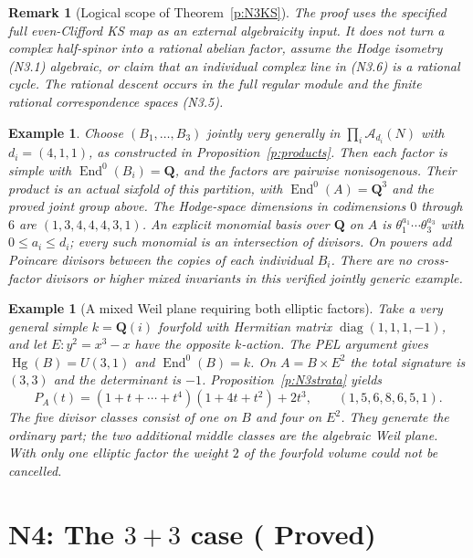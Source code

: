 \documentclass[11pt,reqno]{article}
\theoremstyle{emphasizedplain}
\DeclareRobustCommand{\provedstatus}{%
  \texorpdfstring{\textcolor{ProvedGreen}{\textbf{Proved}}}{Proved}}
\theoremstyle{emphasizeddefinition}
\newtheorem{example}[theorem]{Example}
\theoremstyle{emphasizeddefinition}
\newtheorem{remark}[theorem]{Remark}
\DeclareMathOperator{\End}{End}
\DeclareMathOperator{\Hg}{Hg}
\newcommand{\Q}{\mathbf Q}
\begin{document}
\begin{remark}[Logical scope of Theorem~\ref{p:N3KS}]
The proof uses the \emph{specified} full even-Clifford KS map as an
external algebraicity input. It does not turn a complex half-spinor
into a rational abelian factor, assume the Hodge isometry (N3.1)
algebraic, or claim that an individual complex line in (N3.6) is a
rational cycle. The rational descent occurs in the full regular module
and the finite rational correspondence spaces (N3.5).
\end{remark}
\begin{example}
Choose $(B_1,\ldots,B_{3})$ jointly very generally in
$\prod_i\mathcal A_{d_i}(N)$ with $d_i=(4,1,1)$,
as constructed in Proposition~\ref{p:products}. Then each factor is
simple with $\End^0(B_i)=\Q$, and the factors are pairwise nonisogenous.
Their product is an actual sixfold of this partition, with
$\End^0(A)=\Q^{3}$ and the proved joint group above.
The Hodge-space dimensions in codimensions $0$ through $6$ are
$(1,3,4,4,4,3,1)$.
An explicit monomial basis over $\Q$ on $A$ is
$\theta_1^{a_1}\cdots\theta_{3}^{a_{3}}$ with
$0\leq a_i\leq d_i$; every such monomial is an intersection of divisors.
On powers add Poincare divisors between the copies of each individual
$B_i$. There are no cross-factor divisors or higher mixed invariants in
this verified jointly generic example.
\end{example}
\begin{example}[A mixed Weil plane requiring both elliptic factors]
Take a very general simple $k=\Q(i)$ fourfold with Hermitian matrix
$\operatorname{diag}(1,1,1,-1)$, and let $E:y^2=x^3-x$ have the opposite
$k$-action. The PEL argument gives $\Hg(B)=U(3,1)$ and $\End^0(B)=k$.
On $A=B\times E^2$ the total signature is $(3,3)$ and the determinant
is $-1$. Proposition~\ref{p:N3strata} yields
\[
 P_A(t)=(1+t+\cdots+t^4)(1+4t+t^2)+2t^3,
 \qquad (1,5,6,8,6,5,1).
\]
The five divisor classes consist of one on $B$ and four on $E^2$.
They generate the ordinary part; the two additional middle classes
are the algebraic Weil plane. With only one elliptic factor the weight
$2$ of the fourfold volume could not be cancelled.
\end{example}
\section{N4: The \texorpdfstring{$3+3$}{3+3} case (\provedstatus)}\label{sec:N4}
\end{document}
